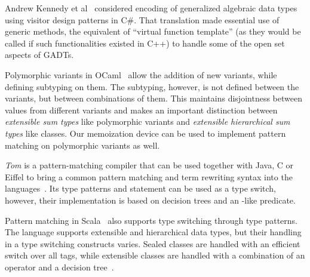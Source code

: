 Andrew Kennedy et al~\cite{GADTOOP05} considered encoding of generalized 
algebraic data types~\cite{SPJ06} using visitor design patterns in C\#.  That 
translation made essential use of generic methods, the equivalent of ``virtual 
function template'' (as they would be called if such functionalities existed in 
C++) to handle some of the open set aspects of GADTs.

Polymorphic variants in OCaml~\cite{garrigue-98} allow the addition of new 
variants, while defining subtyping on them. The subtyping, however, is not 
defined between the variants, but between combinations of them. 
This maintains disjointness between values from different variants and makes an 
important distinction between \emph{extensible sum types} like polymorphic 
variants and \emph{extensible hierarchical sum types} like classes. Our 
memoization device can be used to implement pattern matching on polymorphic 
variants as well.

\emph{Tom} is a pattern-matching compiler that can be used together with Java, C or 
Eiffel to bring a common pattern matching and term rewriting syntax into the 
languages~\cite{Moreau:2003}. Its type patterns and 
statement can be used as a type switch, however, their implementation is based 
on decision trees and an -like predicate.

Pattern matching in Scala~\cite{Scala2nd} also supports type switching through 
type patterns. The language supports extensible and hierarchical data types, but
their handling in a type switching constructs varies. Sealed classes are handled 
with an efficient switch over all tags, while extensible classes are  
handled with a combination of an  operator and a decision 
tree~\cite{EmirThesis}.